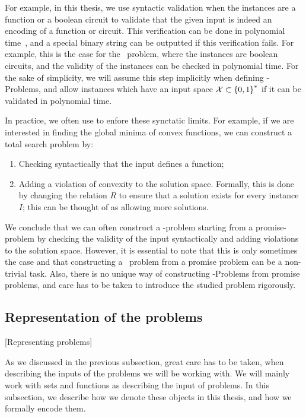 For example, in this thesis, we use syntactic validation when the instances are a function or a boolean circuit to validate that the given input is indeed an encoding of a function or circuit. This verification can be done in polynomial time~, and a special binary string can be outputted if this verification fails. For example, this is the case for the \Tarski\ problem, where the instances are boolean circuits, and the validity of the instances can be checked in polynomial time. For the sake of simplicity, we will assume this step implicitly when defining \TFNP-Problems, and allow instances which have an input space $\mathcal{X} \subset \left\{0, 1\right\}^*$ if it can be validated in polynomial time.

In practice, we often use  to enfore these synctatic limits. For example, if we are interested in finding the global minima of convex functions, we can construct a total search problem by:
\begin{enumerate}
	\item Checking syntactically that the input defines a function;
	\item Adding a violation of convexity to the solution space. Formally, this is done by changing the relation $R$ to ensure that a solution exists for every instance $I$; this can be thought of as allowing more solutions.
\end{enumerate}

We conclude that we can often construct a \TFNP-problem starting from a promise-problem by checking the validity of the input syntactically and adding violations to the solution space. However, it is essential to note that this is only sometimes the case and that constructing a \TFNP\ problem from a promise problem can be a non-trivial task. Also, there is no unique way of constructing \TFNP-Problems from promise problems, and care has to be taken to introduce the studied problem rigorously.

\subsection{Representation of the problems}[Representing problems]

As we discussed in the previous subsection, great care has to be taken, when describing the inputs of the problems we will be working with. We will mainly work with sets and functions as describing the input of problems. In this subsection, we describe how we denote these objects in this thesis, and how we formally encode them.

